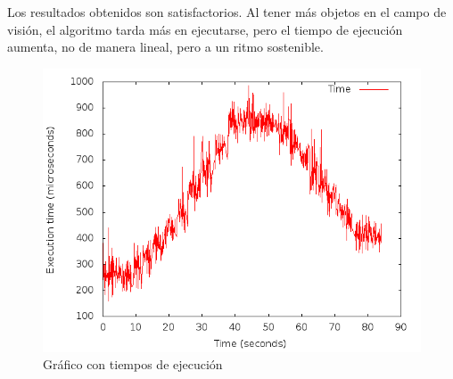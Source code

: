 Los resultados obtenidos son satisfactorios. Al tener más objetos en el campo de visión, el algoritmo tarda más en ejecutarse, pero el tiempo de ejecución aumenta, no de manera lineal, pero a un ritmo sostenible. \\

\begin{figure} [h]
  \begin{center}
    \includegraphics[width=13cm]{img/cap5/10_balls}
  \end{center}
  \caption{Gráfico con tiempos de ejecución}
  \label{fig:10_balls}
\end{figure}
